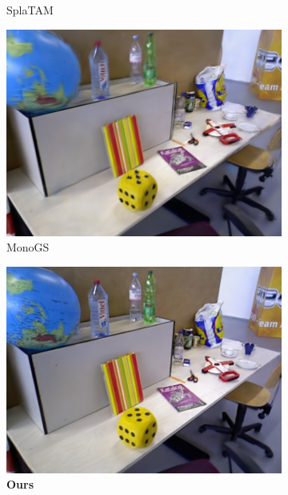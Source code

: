 \begin{figure}[ht]
\begin{subfigure}[t]{0.19\linewidth}
        \caption{SplaTAM \cite{SplaTAM2024}}
        \label{fig:gull}
    \end{subfigure}
    \begin{subfigure}[t]{0.19\linewidth}
        \includegraphics[width=1\linewidth]{fig/fig_rgbd/tum/fr3/MonoGS/00213.png}
        \caption{MonoGS \cite{MonoGS2024}}
        \label{fig:gull}
    \end{subfigure}
    \begin{subfigure}[t]{0.19\linewidth}
        \includegraphics[width=1\linewidth]{fig/fig_rgbd/tum/fr3/HQ-SLAM/30000_207.jpg}
        \caption{{\bf Ours}}
        \label{fig:gull}
    \end{subfigure}
    \begin{subfigure}[t]{0.19\linewidth}

\end{subfigure}
\end{figure}

